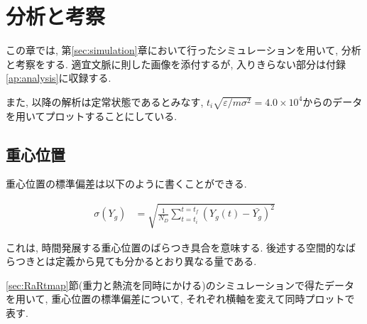 \chapter{分析と考察}\label{chap:analysis}

この章では, 第\ref{sec:simulation}章において行ったシミュレーションを用いて, 分析と考察をする. 適宜文脈に則した画像を添付するが, 入りきらない部分は付録\ref{ap:analysis}に収録する.

また, 以降の解析は定常状態であるとみなす, $t_i \sqrt{\varepsilon / m \sigma^2} = 4.0 \times 10^{4}$からのデータを用いてプロットすることにしている.

\section{重心位置}\label{sec:CoM}


重心位置の標準偏差は以下のように書くことができる.

\begin{align}
  \sigma (Y_g) &= \sqrt{\frac{1}{N_{D}}\sum_{t=t_i}^{t=t_f} (Y_{g}(t) - \bar{Y_g})^2}
\end{align}

これは, 時間発展する重心位置のばらつき具合を意味する. 後述する空間的なばらつきとは定義から見ても分かるとおり異なる量である.

\ref{sec:RaRtmap}節(重力と熱流を同時にかける)のシミュレーションで得たデータを用いて, 重心位置の標準偏差について, それぞれ横軸を変えて同時プロットで表す. 

